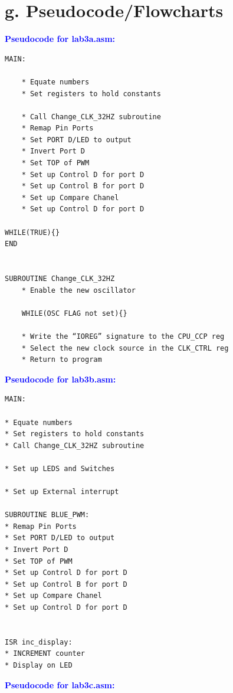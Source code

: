 \documentclass[11pt]{article}
\theoremstyle{plain}
\theoremstyle{definition}
\begin{document}
\section*{g. Pseudocode/Flowcharts}
%
%
\textbf{\textcolor{blue}{Pseudocode for lab3a.asm:}}
\begin{tcolorbox}
\begin{verbatim}
MAIN:

    * Equate numbers
    * Set registers to hold constants

    * Call Change_CLK_32HZ subroutine
    * Remap Pin Ports
    * Set PORT D/LED to output
    * Invert Port D
    * Set TOP of PWM
    * Set up Control D for port D
    * Set up Control B for port D
    * Set up Compare Chanel
    * Set up Control D for port D

WHILE(TRUE){}
END


SUBROUTINE Change_CLK_32HZ
    * Enable the new oscillator

    WHILE(OSC FLAG not set){}

    * Write the “IOREG” signature to the CPU_CCP reg
    * Select the new clock source in the CLK_CTRL reg
    * Return to program
\end{verbatim}
\end{tcolorbox}
%
%
\newpage
\textbf{\textcolor{blue}{Pseudocode for lab3b.asm:}}
\begin{tcolorbox}
\begin{verbatim}
MAIN:

* Equate numbers
* Set registers to hold constants
* Call Change_CLK_32HZ subroutine

* Set up LEDS and Switches

* Set up External interrupt

SUBROUTINE BLUE_PWM:
* Remap Pin Ports
* Set PORT D/LED to output
* Invert Port D
* Set TOP of PWM
* Set up Control D for port D
* Set up Control B for port D
* Set up Compare Chanel
* Set up Control D for port D


ISR inc_display:
* INCREMENT counter
* Display on LED
\end{verbatim}
\end{tcolorbox}	
%
%
\newpage
\textbf{\textcolor{blue}{Pseudocode for lab3c.asm:}}
\end{document}
